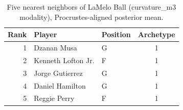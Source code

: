 \begin{table}[htbp]
  \centering\small
  \begin{tabular}{rllc}
    \toprule
    Rank & Player & Position & Archetype \\
    \midrule
    1 & Dzanan Musa & G & 1 \\
    2 & Kenneth Lofton Jr. & F & 1 \\
    3 & Jorge Gutierrez & G & 1 \\
    4 & Daniel Hamilton & G & 1 \\
    5 & Reggie Perry & F & 1 \\
    \bottomrule
  \end{tabular}
  \caption{Five nearest neighbors of LaMelo Ball (curvature_m3 modality), Procrustes-aligned posterior mean.}
  \label{tab:LaMelo_Ball_neighbors_curvature_m3}
\end{table}

